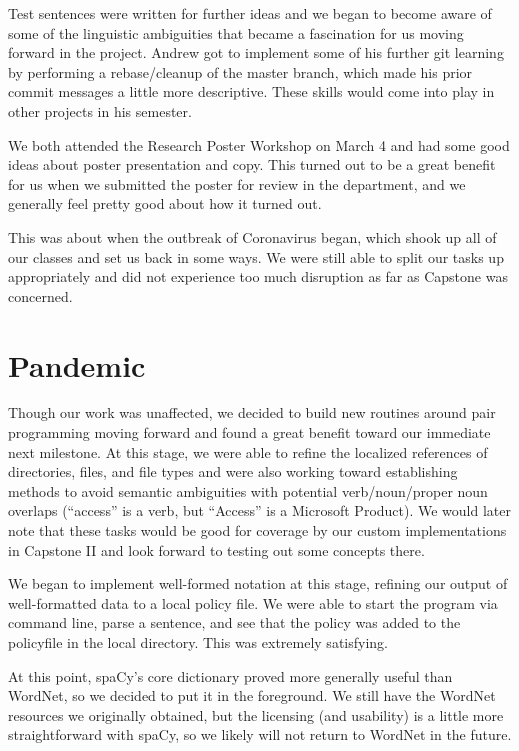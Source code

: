\documentclass[12pt]{article}
\begin{document}
Test sentences were written for further ideas and we began to become aware of some of the linguistic ambiguities that became a fascination for us moving forward in the project. Andrew got to implement some of his further git learning by performing a rebase/cleanup of the master branch, which made his prior commit messages a little more descriptive. These skills would come into play in other projects in his semester.

We both attended the Research Poster Workshop on March 4 and had some good ideas about poster presentation and copy. This turned out to be a great benefit for us when we submitted the poster for review in the department, and we generally feel pretty good about how it turned out.

This was about when the outbreak of Coronavirus began, which shook up all of our classes and set us back in some ways. We were still able to split our tasks up appropriately and did not experience too much disruption as far as Capstone was concerned.

\section{Pandemic}
Though our work was unaffected, we decided to build new routines around pair programming moving forward and found a great benefit toward our immediate next milestone. At this stage, we were able to refine the localized references of directories, files, and file types and were also working toward establishing methods to avoid semantic ambiguities with potential verb/noun/proper noun overlaps (“access” is a verb, but “Access” is a Microsoft Product). We would later note that these tasks would be good for coverage by our custom implementations in Capstone II and look forward to testing out some concepts there. 

We began to implement well-formed notation at this stage, refining our output of well-formatted data to a local policy file. We were able to start the program via command line, parse a sentence, and see that the policy was added to the policyfile in the local directory. This was extremely satisfying.

At this point, spaCy's core dictionary proved more generally useful than WordNet, so we decided to put it in the foreground. We still have the WordNet resources we originally obtained, but the licensing (and usability) is a little more straightforward with spaCy, so we likely will not return to WordNet in the future.
\end{document}
